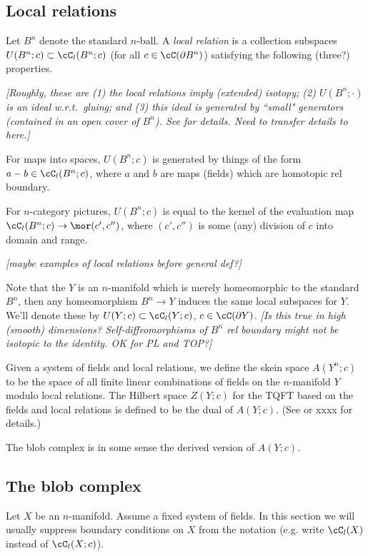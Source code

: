 \documentclass[11pt,leqno]{amsart}
\def\bd{\partial}
\def\sub{\subset}
\def\nn#1{{{\it \small [#1]}}}
\begin{document}
\subsection{Local relations}
\label{sec:local-relations}

Let $B^n$ denote the standard $n$-ball.
A {\it local relation} is a collection subspaces $U(B^n; c) \sub \cC_l(B^n; c)$
(for all $c \in \cC(\bd B^n)$) satisfying the following (three?) properties.

\nn{Roughly, these are (1) the local relations imply (extended) isotopy;
(2) $U(B^n; \cdot)$ is an ideal w.r.t.\ gluing; and
(3) this ideal is generated by ``small" generators (contained in an open cover of $B^n$).
See \cite{kw:tqft} for details.  Need to transfer details to here.}

For maps into spaces, $U(B^n; c)$ is generated by things of the form $a-b \in \cC_l(B^n; c)$,
where $a$ and $b$ are maps (fields) which are homotopic rel boundary.

For $n$-category pictures, $U(B^n; c)$ is equal to the kernel of the evaluation map
$\cC_l(B^n; c) \to \mor(c', c'')$, where $(c', c'')$ is some (any) division of $c$ into
domain and range.

\nn{maybe examples of local relations before general def?}

Note that the $Y$ is an $n$-manifold which is merely homeomorphic to the standard $B^n$,
then any homeomorphism $B^n \to Y$ induces the same local subspaces for $Y$.
We'll denote these by $U(Y; c) \sub \cC_l(Y; c)$, $c \in \cC(\bd Y)$.
\nn{Is this true in high (smooth) dimensions?  Self-diffeomorphisms of $B^n$
rel boundary might not be isotopic to the identity.  OK for PL and TOP?}

Given a system of fields and local relations, we define the skein space
$A(Y^n; c)$ to be the space of all finite linear combinations of fields on
the $n$-manifold $Y$ modulo local relations.
The Hilbert space $Z(Y; c)$ for the TQFT based on the fields and local relations
is defined to be the dual of $A(Y; c)$.
(See \cite{kw:tqft} or xxxx for details.)

The blob complex is in some sense the derived version of $A(Y; c)$.



\subsection{The blob complex}
\label{sec:blob-definition}

Let $X$ be an $n$-manifold.
Assume a fixed system of fields.
In this section we will usually suppress boundary conditions on $X$ from the notation
(e.g. write $\cC_l(X)$ instead of $\cC_l(X; c)$).
\end{document}
